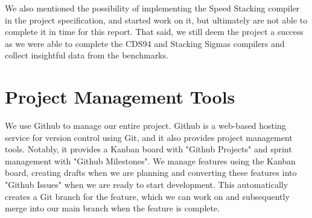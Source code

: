 We also mentioned the possibility of implementing the 
Speed Stacking compiler \cite{SpeedStacking} in the project specification, and started work on 
it, but ultimately are not able to complete it in time for this report. That said, we still 
deem the project a success as we were able to complete the CDS94 and Stacking Sigmas compilers 
and collect insightful data from the benchmarks. 

\section{Project Management Tools}
We use Github to manage our entire project. Github is a web-based hosting service for version 
control using Git, and it also provides project management tools. Notably, it provides a 
Kanban board with "Github Projects" and sprint management with "Github Milestones". We manage 
features using the Kanban board, creating drafts when we are planning and converting these 
features into "Github Issues" when we are ready to start development. This automatically creates a 
Git branch for the feature, which we can work on and subsequently merge into our main branch 
when the feature is complete. 

